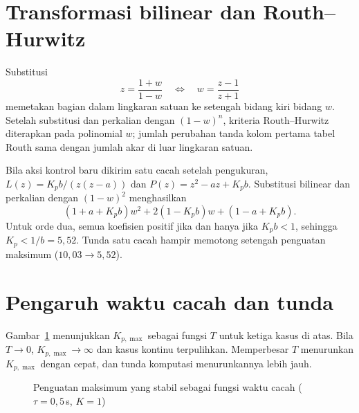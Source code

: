 \section{Transformasi bilinear dan Routh--Hurwitz}
Substitusi
\begin{equation}
	z = \frac{1+w}{1-w}\quad\Longleftrightarrow\quad w = \frac{z-1}{z+1}
\end{equation}
memetakan bagian dalam lingkaran satuan ke setengah bidang kiri bidang $w$. Setelah substitusi dan perkalian dengan $(1-w)^n$, kriteria Routh--Hurwitz diterapkan pada polinomial $w$; jumlah perubahan tanda kolom pertama tabel Routh sama dengan jumlah akar di luar lingkaran satuan.

\begin{contoh}
	Bila aksi kontrol baru dikirim satu cacah setelah pengukuran, $L(z) = K_pb/(z(z-a))$ dan $P(z) = z^2 - az + K_pb$. Substitusi bilinear dan perkalian dengan $(1-w)^2$ menghasilkan
	\[
		(1 + a + K_pb)w^2 + 2(1 - K_pb)w + (1 - a + K_pb).
	\]
	Untuk orde dua, semua koefisien positif jika dan hanya jika $K_pb < 1$, sehingga $K_p < 1/b = 5{,}52$. Tunda satu cacah hampir memotong setengah penguatan maksimum ($10{,}03 \rightarrow 5{,}52$).
\end{contoh}

\section{Pengaruh waktu cacah dan tunda}
Gambar~\ref{fig:b7-kmax} menunjukkan $K_{p,\max}$ sebagai fungsi $T$ untuk ketiga kasus di atas. Bila $T \to 0$, $K_{p,\max} \to \infty$ dan kasus kontinu terpulihkan. Memperbesar $T$ menurunkan $K_{p,\max}$ dengan cepat, dan tunda komputasi menurunkannya lebih jauh.

\begin{figure}[H]
	\centering
	\caption{Penguatan maksimum yang stabil sebagai fungsi waktu cacah ($\tau = 0{,}5$\,s, $K=1$)}
	\label{fig:b7-kmax}
\end{figure}

